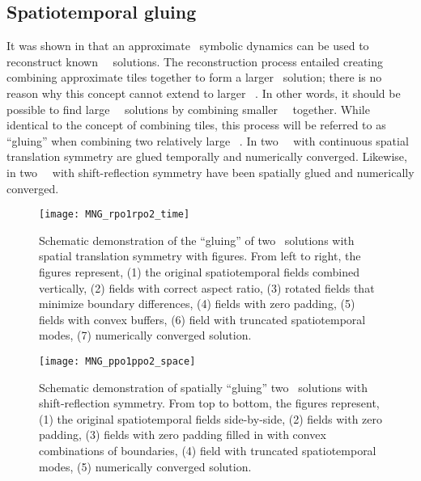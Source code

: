 \subsection{Spatiotemporal gluing}
It was shown in  that an approximate \spt\ symbolic dynamics can be used to
reconstruct known \spt\ \twot\ solutions.
The reconstruction process entailed creating combining approximate tiles together to form a larger
\spt\ solution; there is no reason why this concept cannot extend to larger \spt\ \twots{}.
In other words, it should be possible to find large \spt\ \twot\ solutions
by combining smaller \spt\ \twots\ together. While identical to the concept of combining tiles, this process
will be referred to as ``gluing'' when combining two relatively large \spt\ \twots{}.
In  two \spt\ \twots\ with continuous spatial translation symmetry are glued
temporally and numerically converged.
Likewise, in  two \spt\ \twots\ with shift-reflection symmetry have been spatially glued
and numerically converged.

\begin{figure} %
\centering
\begin{minipage}[height=.25\textheight]{.9\textwidth}
\texttt{[image: MNG\_rpo1rpo2\_time]}
 \end{minipage}
\caption{ \label{fig:MNGtimeglue}
Schematic demonstration of the ``gluing''  of two \twot\ solutions with
spatial translation symmetry with figures. From left to right, the
figures represent, (1) the original spatiotemporal fields combined vertically, (2) fields
with correct aspect ratio, (3) rotated fields that minimize boundary differences, (4) fields with zero padding, (5) fields with convex
buffers, (6) field with truncated spatiotemporal modes, (7) numerically
converged solution.
}
\end{figure}

\begin{figure} %
\centering
\begin{minipage}[height=.6\textheight]{.6\textwidth}
\texttt{[image: MNG\_ppo1ppo2\_space]}
\end{minipage}
\caption{ \label{fig:MNGspaceglue}
Schematic demonstration of spatially ``gluing''  two \twot\ solutions with shift-reflection symmetry.  From top to bottom,
the figures represent, (1) the original spatiotemporal fields side-by-side, (2) fields with zero padding, (3) fields with zero padding filled in with convex combinations
of boundaries, (4) field with truncated spatiotemporal modes, (5) numerically converged solution.
}
\end{figure}

